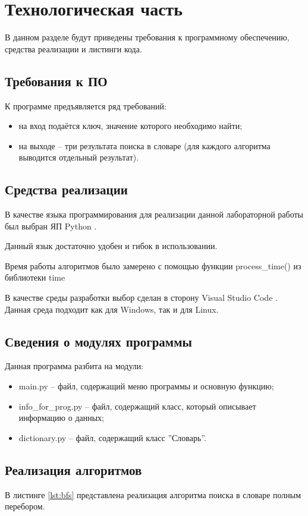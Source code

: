 \chapter{Технологическая часть}
В данном разделе будут приведены требования к программному обеспечению, средства реализации и листинги кода.

\section{Требования к ПО}

К программе предъявляется ряд требований:
\begin{itemize}
	\item на вход подаётся ключ, значение которого необходимо найти;
	\item на выходе -- три результата поиска в словаре (для каждого алгоритма выводится отдельный результат).
\end{itemize}

\section{Средства реализации}

В качестве языка программирования для реализации данной лабораторной работы был выбран ЯП Python \cite{pythonlang}. 

Данный язык достаточно удобен и гибок в использовании. 

Время работы алгоритмов было замерено с помощью функции process\_time() из библиотеки time \cite{pythonlangtime}

В качестве среды разработки выбор сделан в сторону Visual Studio Code \cite{wind}. Данная среда подходит как для Windows, так и для Linux.

\section{Сведения о модулях программы}
Данная программа разбита на модули:
\begin{itemize}
	\item main.py -- файл, содержащий меню программы и основную функцию;
	\item info\_for\_prog.py -- файл, содержащий класс, который описывает информацию о данных;
	\item dictionary.py -- файл, содержащий класс ''Словарь''.
\end{itemize}

\section{Реализация алгоритмов}
В листинге \ref{lst:bfs} представлена реализация алгоритма поиска в словаре полным перебором.

